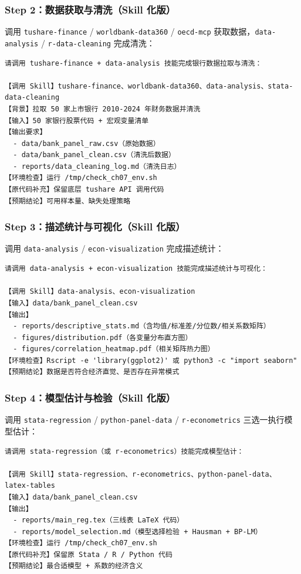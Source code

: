 \subsubsection{Step 2：数据获取与清洗（Skill 化版）}

调用 \texttt{tushare-finance} / \texttt{worldbank-data360} / \texttt{oecd-mcp} 获取数据，\texttt{data-analysis} / \texttt{r-data-cleaning} 完成清洗：

\begin{lstlisting}
请调用 tushare-finance + data-analysis 技能完成银行数据拉取与清洗：

【调用 Skill】tushare-finance、worldbank-data360、data-analysis、stata-data-cleaning
【背景】拉取 50 家上市银行 2010-2024 年财务数据并清洗
【输入】50 家银行股票代码 + 宏观变量清单
【输出要求】
  - data/bank_panel_raw.csv（原始数据）
  - data/bank_panel_clean.csv（清洗后数据）
  - reports/data_cleaning_log.md（清洗日志）
【环境检查】运行 /tmp/check_ch07_env.sh
【原代码补充】保留底层 tushare API 调用代码
【预期结论】可用样本量、缺失处理策略
\end{lstlisting}

\subsubsection{Step 3：描述统计与可视化（Skill 化版）}

调用 \texttt{data-analysis} / \texttt{econ-visualization} 完成描述统计：

\begin{lstlisting}
请调用 data-analysis + econ-visualization 技能完成描述统计与可视化：

【调用 Skill】data-analysis、econ-visualization
【输入】data/bank_panel_clean.csv
【输出】
  - reports/descriptive_stats.md（含均值/标准差/分位数/相关系数矩阵）
  - figures/distribution.pdf（各变量分布直方图）
  - figures/correlation_heatmap.pdf（相关矩阵热力图）
【环境检查】Rscript -e 'library(ggplot2)' 或 python3 -c "import seaborn"
【预期结论】数据是否符合经济直觉、是否存在异常模式
\end{lstlisting}

\subsubsection{Step 4：模型估计与检验（Skill 化版）}

调用 \texttt{stata-regression} / \texttt{python-panel-data} / \texttt{r-econometrics} 三选一执行模型估计：

\begin{lstlisting}
请调用 stata-regression（或 r-econometrics）技能完成模型估计：

【调用 Skill】stata-regression、r-econometrics、python-panel-data、latex-tables
【输入】data/bank_panel_clean.csv
【输出】
  - reports/main_reg.tex（三线表 LaTeX 代码）
  - reports/model_selection.md（模型选择检验 + Hausman + BP-LM）
【环境检查】运行 /tmp/check_ch07_env.sh
【原代码补充】保留原 Stata / R / Python 代码
【预期结论】最合适模型 + 系数的经济含义
\end{lstlisting}

